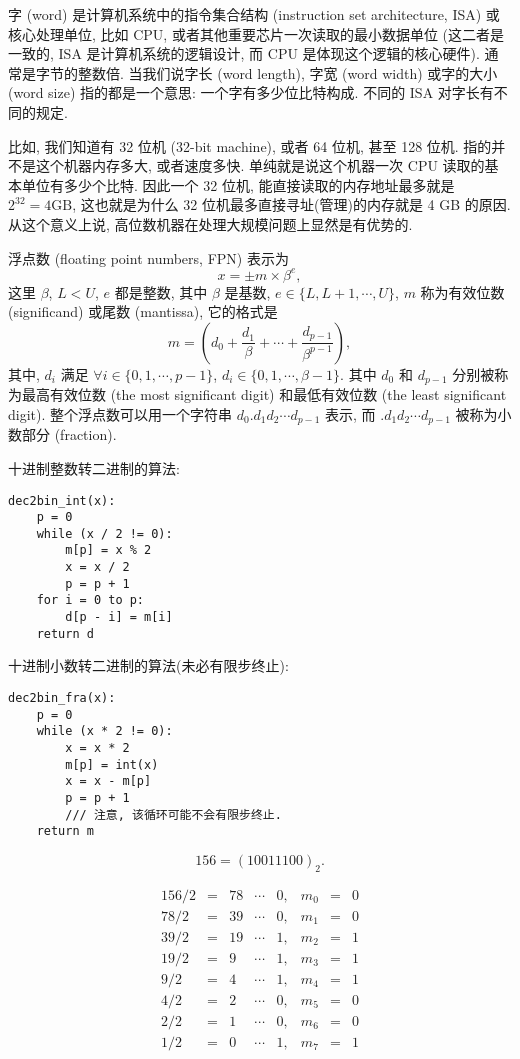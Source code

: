 \documentclass[a4paper]{ctexart}
\begin{document}
{ 字 (word) 是计算机系统中的指令集合结构
(instruction set architecture, ISA) 或核心处理单位, 比如 CPU,
或者其他重要芯片一次读取的最小数据单位 (这二者是一致的, ISA 是计算机系统的逻辑设计,
而 CPU 是体现这个逻辑的核心硬件). 通常是字节的整数倍.
当我们说字长 (word length), 字宽 (word width) 或字的大小 (word size)
指的都是一个意思: 一个字有多少位比特构成. 不同的 ISA 对字长有不同的规定.

 比如, 我们知道有 32 位机 (32-bit machine),
或者 64 位机, 甚至 128 位机. 指的并不是这个机器内存多大, 或者速度多快.
单纯就是说这个机器一次 CPU 读取的基本单位有多少个比特. 因此一个 32 位机,
能直接读取的内存地址最多就是 $2^{32} = 4\mbox{GB}$,
这也就是为什么 32 位机最多直接寻址(管理)的内存就是 4 GB 的原因.
从这个意义上说, 高位数机器在处理大规模问题上显然是有优势的. 

 浮点数 (floating point numbers, FPN)
表示为
$$
x = \pm m \times \beta^e,
$$
这里 $\beta$, $L < U$, $e$ 都是整数, 其中 $\beta$ 是基数,
$e \in \{L, L + 1, \cdots, U\}$,
$m$ 称为有效位数 (significand) 或尾数 (mantissa), 它的格式是
$$
m = \left(d_0 + \frac{d_1}{\beta} + \cdots
+ \frac{d_{p - 1}}{\beta^{p - 1}}\right),
$$
其中, $d_i$ 满足 $\forall i \in \{0, 1, \cdots, p - 1\}$,
$d_i \in \{0, 1, \cdots, \beta - 1\}$. 其中 $d_0$ 和
$d_{p - 1}$ 分别被称为最高有效位数 (the most significant digit)
和最低有效位数 (the least significant digit).
整个浮点数可以用一个字符串 $d_0.d_1d_2\cdots d_{p - 1}$ 表示, 而
$.d_1d_2\cdots d_{p - 1}$ 被称为小数部分 (fraction).

 十进制整数转二进制的算法:
\begin{verbatim}
dec2bin_int(x):
    p = 0
    while (x / 2 != 0):
        m[p] = x % 2
        x = x / 2
        p = p + 1
    for i = 0 to p:
        d[p - i] = m[i]
    return d
\end{verbatim}
十进制小数转二进制的算法(未必有限步终止):
\begin{verbatim}
dec2bin_fra(x):
    p = 0
    while (x * 2 != 0):
        x = x * 2
        m[p] = int(x)
        x = x - m[p]
        p = p + 1
        /// 注意, 该循环可能不会有限步终止.
    return m
\end{verbatim}

$$
156 = (10011100)_2.
$$

$$
\begin{array}{rclclrcl}
  156 / 2 &=& 78 &\cdots& 0,& m_0 &=& 0 \\
  78 / 2 &=& 39 &\cdots& 0,& m_1 &=& 0 \\
  39 / 2 &=& 19 &\cdots& 1,& m_2 &=& 1\\
  19 / 2 &=& 9 &\cdots& 1,& m_3 &=& 1\\
  9 / 2 &=& 4 &\cdots& 1,& m_4 &=& 1\\
  4 / 2 &=& 2 &\cdots& 0,& m_5 &=& 0\\
  2 / 2 &=& 1 &\cdots& 0,& m_6 &=& 0\\
  1 / 2 &=& 0 &\cdots& 1,& m_7 &=& 1
\end{array}
$$

}
\end{document}
